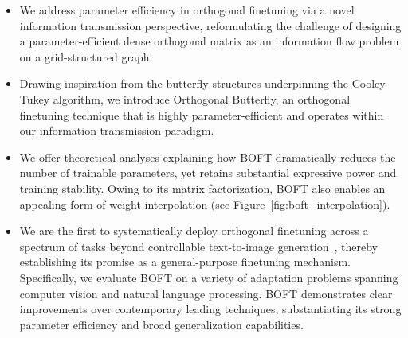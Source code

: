 \begin{itemize}[leftmargin=*,nosep]
    \item We address parameter efficiency in orthogonal finetuning via a novel information transmission perspective, reformulating the challenge of designing a parameter-efficient dense orthogonal matrix as an information flow problem on a grid-structured graph.
    \item Drawing inspiration from the butterfly structures underpinning the Cooley-Tukey algorithm, we introduce Orthogonal Butterfly, an orthogonal finetuning technique that is highly parameter-efficient and operates within our information transmission paradigm.
    \item We offer theoretical analyses explaining how BOFT dramatically reduces the number of trainable parameters, yet retains substantial expressive power and training stability. Owing to its matrix factorization, BOFT also enables an appealing form of weight interpolation (see Figure~\ref{fig:boft_interpolation}).
    \item We are the first to systematically deploy orthogonal finetuning across a spectrum of tasks beyond controllable text-to-image generation~\cite{qiu2023controlling}, thereby establishing its promise as a general-purpose finetuning mechanism. Specifically, we evaluate BOFT on a variety of adaptation problems spanning computer vision and natural language processing. BOFT demonstrates clear improvements over contemporary leading techniques, substantiating its strong parameter efficiency and broad generalization capabilities.
\end{itemize}

